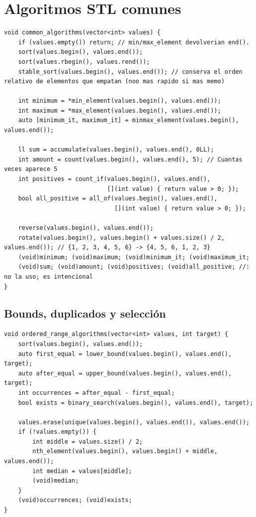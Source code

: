 \section{Algoritmos STL comunes}

\begin{lstlisting}[style=cpp]
void common_algorithms(vector<int> values) {
    if (values.empty()) return; // min/max_element devolverian end().
    sort(values.begin(), values.end());
    sort(values.rbegin(), values.rend());
    stable_sort(values.begin(), values.end()); // conserva el orden relativo de elementos que empatan (noo mas rapido si mas memo)

    int minimum = *min_element(values.begin(), values.end());
    int maximum = *max_element(values.begin(), values.end());
    auto [minimum_it, maximum_it] = minmax_element(values.begin(), values.end());

    ll sum = accumulate(values.begin(), values.end(), 0LL);
    int amount = count(values.begin(), values.end(), 5); // Cuantas veces aparece 5
    int positives = count_if(values.begin(), values.end(),
                             [](int value) { return value > 0; });
    bool all_positive = all_of(values.begin(), values.end(),
                               [](int value) { return value > 0; });

    reverse(values.begin(), values.end());
    rotate(values.begin(), values.begin() + values.size() / 2, values.end()); // {1, 2, 3, 4, 5, 6} -> {4, 5, 6, 1, 2, 3}
    (void)minimum; (void)maximum; (void)minimum_it; (void)maximum_it;
    (void)sum; (void)amount; (void)positives; (void)all_positive; //: no la uso; es intencional
}
\end{lstlisting}

\subsection{Bounds, duplicados y selecci\'on}

\begin{lstlisting}[style=cpp]
void ordered_range_algorithms(vector<int> values, int target) {
    sort(values.begin(), values.end());
    auto first_equal = lower_bound(values.begin(), values.end(), target);
    auto after_equal = upper_bound(values.begin(), values.end(), target);
    int occurrences = after_equal - first_equal;
    bool exists = binary_search(values.begin(), values.end(), target);

    values.erase(unique(values.begin(), values.end()), values.end());
    if (!values.empty()) {
        int middle = values.size() / 2;
        nth_element(values.begin(), values.begin() + middle, values.end());
        int median = values[middle];
        (void)median;
    }
    (void)occurrences; (void)exists;
}
\end{lstlisting}

